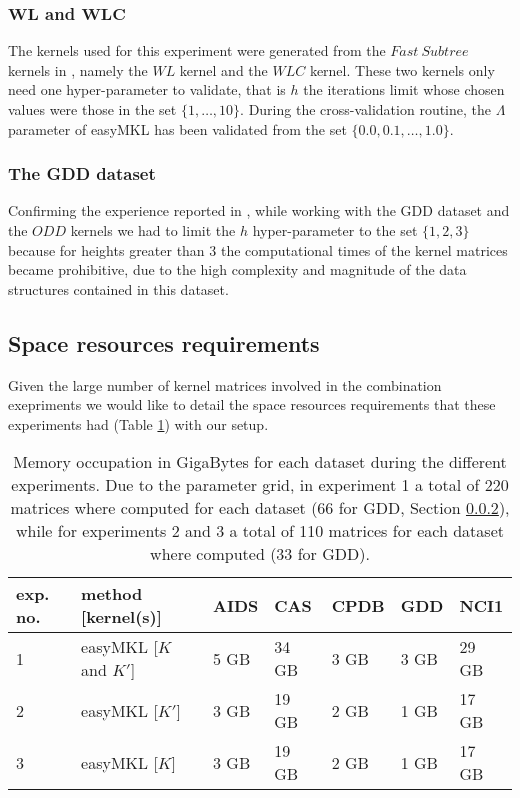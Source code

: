 \subsubsection[$WL$ and $WLC$]{$\boldsymbol{WL}$ and $\boldsymbol{WLC}$}
The kernels used for this experiment were generated from the $Fast~Subtree$ kernels
in \cite{fs, rtesselli}, namely the $WL$ kernel and the $WLC$ kernel.
These two kernels only need one hyper-parameter to validate, that is $h$ the iterations
limit whose chosen values were those in the set $\{1,\dots,10\}$.
During the cross-validation routine, the $\Lambda$ parameter of easyMKL has been
validated from the set $\{0.0, 0.1,\dots,1.0\}$.

\subsubsection{The GDD dataset}
\label{subsubsec:gdd}
Confirming the experience reported in \cite{contexts}, while working with the GDD
dataset and the $ODD$ kernels we had to limit the $h$ hyper-parameter to the set
$\{1,2,3\}$ because for heights greater than 3 the computational times of the
kernel matrices became prohibitive, due to the high complexity and magnitude
of the data structures contained in this dataset.

\subsection{Space resources requirements}
Given the large number of kernel matrices involved in the combination exepriments
we would like to detail the space resources requirements that these experiments
had (Table \ref{table:space}) with our setup.

\begin{table}[ht]
    \centering
    \begin{tabular}{|l|l|l|l|l|l|l|}
        \hline
        exp. no. & method [kernel(s)] & AIDS & CAS & CPDB & GDD & NCI1 \\
        \hline
        1 & easyMKL [$K$ and $K'$] & 5 GB & 34 GB & 3 GB & 3 GB & 29 GB \\
        \hline
        2 & easyMKL [$K'$] & 3 GB & 19 GB & 2 GB & 1 GB & 17 GB \\
        \hline
        3 & easyMKL [$K$] & 3 GB & 19 GB & 2 GB & 1 GB & 17 GB \\
        \hline
    \end{tabular}
    \caption{Memory occupation in GigaBytes for each dataset during the different
    experiments. Due to the parameter grid, in experiment 1 a total of 220 matrices
    where computed for each dataset (66 for GDD, Section \ref{subsubsec:gdd}), while
    for experiments 2 and 3 a total of 110 matrices for each dataset where computed
    (33 for GDD).}
    \label{table:space}
\end{table}

